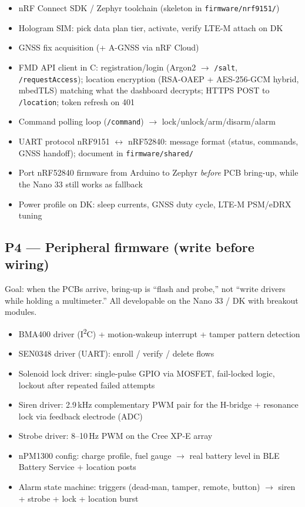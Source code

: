 \documentclass[11pt,a4paper]{article}
\newcommand{\todo}{$\square$}
\begin{document}
\begin{itemize}
  \item[\todo] nRF Connect SDK / Zephyr toolchain (skeleton in \texttt{firmware/nrf9151/})
  \item[\todo] Hologram SIM: pick data plan tier, activate, verify LTE-M attach on DK
  \item[\todo] GNSS fix acquisition (+ A-GNSS via nRF Cloud)
  \item[\todo] FMD API client in C: registration/login (Argon2 $\rightarrow$ \texttt{/salt}, \texttt{/requestAccess}); location encryption (RSA-OAEP + AES-256-GCM hybrid, mbedTLS) matching what the dashboard decrypts; HTTPS POST to \texttt{/location}; token refresh on 401
  \item[\todo] Command polling loop (\texttt{/command}) $\rightarrow$ lock/unlock/arm/disarm/alarm
  \item[\todo] UART protocol nRF9151 $\leftrightarrow$ nRF52840: message format (status, commands, GNSS handoff); document in \texttt{firmware/shared/}
  \item[\todo] Port nRF52840 firmware from Arduino to Zephyr \emph{before} PCB bring-up, while the Nano 33 still works as fallback
  \item[\todo] Power profile on DK: sleep currents, GNSS duty cycle, LTE-M PSM/eDRX tuning
\end{itemize}

\subsection{P4 --- Peripheral firmware (write before wiring)}

Goal: when the PCBs arrive, bring-up is ``flash and probe,'' not ``write drivers while holding a multimeter.'' All developable on the Nano 33 / DK with breakout modules.

\begin{itemize}
  \item[\todo] BMA400 driver (I\textsuperscript{2}C) + motion-wakeup interrupt + tamper pattern detection
  \item[\todo] SEN0348 driver (UART): enroll / verify / delete flows
  \item[\todo] Solenoid lock driver: single-pulse GPIO via MOSFET, fail-locked logic, lockout after repeated failed attempts
  \item[\todo] Siren driver: 2.9\,kHz complementary PWM pair for the H-bridge + resonance lock via feedback electrode (ADC)
  \item[\todo] Strobe driver: 8--10\,Hz PWM on the Cree XP-E array
  \item[\todo] nPM1300 config: charge profile, fuel gauge $\rightarrow$ real battery level in BLE Battery Service + location posts
  \item[\todo] Alarm state machine: triggers (dead-man, tamper, remote, button) $\rightarrow$ siren + strobe + lock + location burst
\end{itemize}
\end{document}
